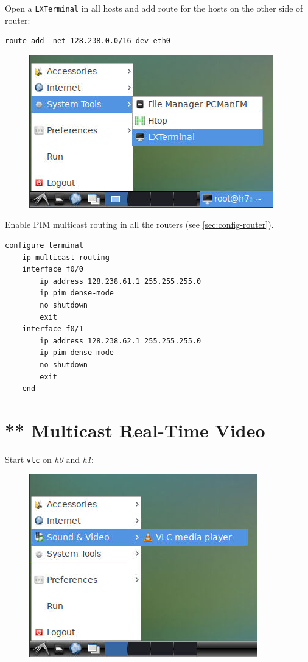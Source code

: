 \documentclass{../UTNetLab}
\begin{document}
    Open a \texttt{LXTerminal} in all hosts and add route for the hosts on the other side of router:
    \begin{lstlisting}[emph={eth0}]
route add -net 128.238.0.0/16 dev eth0
    \end{lstlisting}

    \begin{figure}[H]
        \centering
        \includegraphics[scale=2.0]{img/terminal}
    \end{figure}

    Enable PIM multicast routing in all the routers (see \autoref{sec:config-router}). 
    \begin{lstlisting}[language={cisco}, emph={ethernet0_ip, ethernet1_ip}]
configure terminal
    ip multicast-routing
    interface f0/0
        ip address 128.238.61.1 255.255.255.0
        ip pim dense-mode
        no shutdown
        exit
    interface f0/1
        ip address 128.238.62.1 255.255.255.0
        ip pim dense-mode
        no shutdown
        exit
    end
    \end{lstlisting}

\section{** Multicast Real-Time Video}
    Start \lstinline{vlc} on \textit{h0} and \textit{h1}:
    \begin{figure}[H]
        \centering
        \includegraphics[scale=2.0]{img/vlc-open}
    \end{figure}
\end{document}
